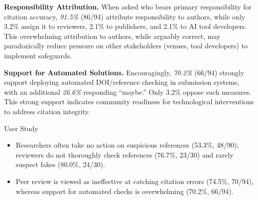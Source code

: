 \noindent
\textbf{Responsibility Attribution.}
When asked who bears primary responsibility for citation accuracy, \textit{91.5\%} (86/94) attribute responsibility to authors, while only 3.2\% assign it to reviewers, 2.1\% to publishers, and 2.1\% to AI tool developers.
This overwhelming attribution to authors, while arguably correct, may paradoxically reduce pressure on other stakeholders (venues, tool developers) to implement safeguards.

\noindent
\textbf{Support for Automated Solutions.}
Encouragingly, \textit{70.2\%} (66/94) strongly support deploying automated DOI/reference checking in submission systems, with an additional \textit{26.6\%} responding ``maybe.''
Only 3.2\% oppose such measures.
This strong support indicates community readiness for technological interventions to address citation integrity.

\begin{keyfindingsSidebar}{User Study}
\begin{itemize}
    \setlength{\itemsep}{-0pt}
    \setlength{\topsep}{0pt}
    \setlength{\partopsep}{0pt}
    \setlength{\parsep}{-0pt}
    \item Researchers often take no action on suspicious references (53.3\%, 48/90); reviewers do not thoroughly check references (76.7\%, 23/30) and rarely suspect fakes (80.0\%, 24/30).
    \item Peer review is viewed as ineffective at catching citation errors (74.5\%, 70/94), whereas support for automated checks is overwhelming (70.2\%, 66/94).
\end{itemize}
\end{keyfindingsSidebar}




